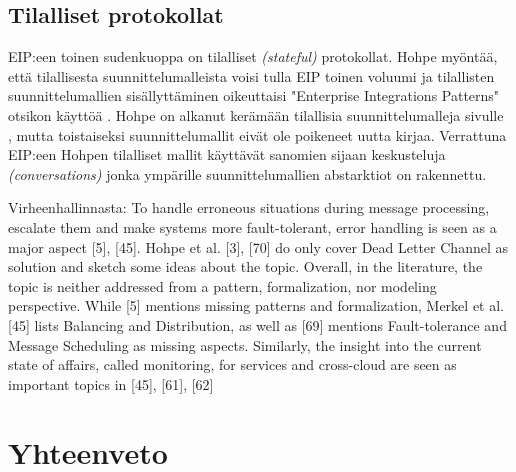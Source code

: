 \section{Tilalliset protokollat}
EIP:een toinen sudenkuoppa on tilalliset \textit{(stateful)} protokollat. Hohpe myöntää, että tilallisesta suunnittelumalleista voisi tulla EIP toinen voluumi ja tilallisten suunnittelumallien sisällyttäminen oikeuttaisi "Enterprise Integrations Patterns" otsikon käyttöä \citep{Zimmermann2016}.
Hohpe on alkanut kerämään tilallisia suunnittelumalleja sivulle \citep{conversationPatterns}, mutta toistaiseksi suunnittelumallit eivät ole poikeneet uutta kirjaa. Verrattuna EIP:een Hohpen tilalliset mallit käyttävät sanomien sijaan keskusteluja \textit{(conversations)} jonka ympärille suunnittelumallien abstarktiot on rakennettu.



Virheenhallinnasta:
To handle erroneous situations during message processing, escalate them and make systems more fault-tolerant, error handling is seen as a major aspect [5], [45]. Hohpe et al. [3], [70] do only cover Dead Letter Channel as solution and sketch some ideas about the topic. Overall, in the literature, the topic is neither addressed from a pattern, formalization, nor modeling perspective. While [5] mentions missing patterns and formalization, Merkel et al. [45] lists Balancing and Distribution, as well as [69] mentions Fault-tolerance and Message Scheduling as missing aspects. Similarly, the insight into the current state of affairs, called monitoring, for services and cross-cloud are seen as important topics in [45], [61], [62]\citep{Ritter2017}




\chapter{Yhteenveto}
